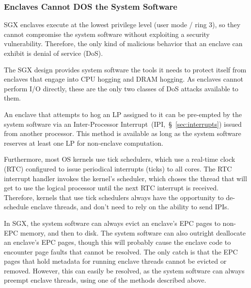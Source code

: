 \subsubsection{Enclaves Cannot DOS the System Software}

SGX enclaves execute at the lowest privilege level (user mode / ring 3), so
they cannot compromise the system software without exploiting a security
vulnerability. Therefore, the only kind of malicious behavior that an enclave
can exhibit is denial of service (DoS).

The SGX design provides system software the tools it needs to protect itself
from enclaves that engage into CPU hogging and DRAM hogging. As enclaves cannot
perform I/O directly, these are the only two classes of DoS attacks available
to them.

An enclave that attempts to hog an LP assigned to it can be pre-empted by the
system software via an Inter-Processor Interrupt~(IPI,~\S~\ref{sec:interrupts})
issued from another processor. This method is available as long as the system
software reserves at least one LP for non-enclave computation.

Furthermore, most OS kernels use tick schedulers, which use a real-time clock
(RTC) configured to issue periodical interrupts (ticks) to all cores. The RTC
interrupt handler invokes the kernel's scheduler, which choses the thread that
will get to use the logical processor until the next RTC interrupt is received.
Therefore, kernels that use tick schedulers always have the opportunity to
de-schedule enclave threads, and don't need to rely on the ability to send
IPIs.

In SGX, the system software can always evict an enclave's EPC pages to non-EPC
memory, and then to disk. The system software can also outright deallocate an
enclave's EPC pages, though this will probably cause the enclave code to
encounter page faults that cannot be resolved. The only catch is that the EPC
pages that hold metadata for running enclave threads cannot be evicted or
removed. However, this can easily be resolved, as the system software can
always preempt enclave threads, using one of the methods described above.

%


